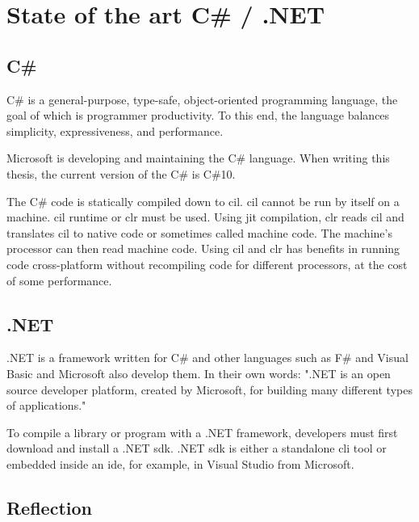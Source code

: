 \chapter {State of the art C\# / .NET }

\section {C\#}
C\# is a general-purpose, type-safe, object-oriented programming language, the goal of which is programmer productivity.
To this end, the language balances simplicity, expressiveness,
and performance. \cite{albahari_c_2019}

Microsoft is developing and maintaining the C\# language. When writing this thesis, the current version of the C\# is C\#10.

The C\# code is statically compiled down to \acrlong{cil}. \acrshort{cil} cannot be run by itself on a machine.
\acrshort{cil} runtime or \acrfull{clr} must be used. Using \acrfull{jit} compilation, \acrshort{clr} reads \acrshort{cil} and translates \acrshort{cil} to native
code or sometimes called machine code. The machine's processor can then read machine code. Using \acrshort{cil} and \acrshort{clr} has benefits in running code
cross-platform without recompiling code for different processors, at the cost of some performance. \cite{rodenburg_code_2021}

\section {.NET}

.NET is a framework written for C\# and other languages such as F\# and
Visual Basic and Microsoft also develop them.
In their own words: ".NET is an open source developer
platform, created by Microsoft, for building many different types of applications." \cite{noauthor_what_nodate-2}

To compile a library or program with a .NET framework,
developers must first download and install a .NET \acrfull{sdk}.
.NET \acrfull{sdk} is either a standalone \acrfull{cli} tool or embedded inside an \acrshort{ide},
for example, in Visual Studio from Microsoft.

\section{Reflection}

